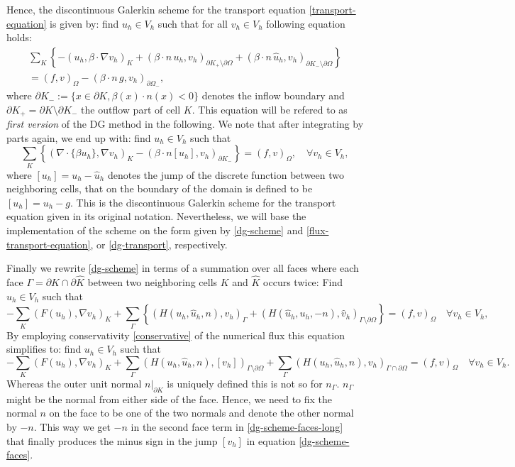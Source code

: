 \documentclass[11pt]{article}
\begin{document}
Hence, the discontinuous Galerkin scheme for the transport equation
\eqref{transport-equation} is given by: find $u_h\in V_h$ such that for all $v_h\in V_h$ following equation holds:
\begin{multline}\label{dg-transport}
  \sum_K\left\{-(u_h,\beta\cdot\nabla v_h)_K+(\beta\cdot n\, u_h, v_h)_{\partial K_+\setminus\partial\Omega}+(\beta\cdot n\, \hat u_h, v_h)_{\partial K_-\setminus\partial\Omega}\right\}\\
=(f,v)_\Omega-(\beta\cdot n\, g, v_h)_{\partial\Omega_-},
\end{multline}
where $\partial K_-:=\{x\in\partial K, \beta(x)\cdot n(x)<0\}$ denotes
the inflow boundary and $\partial K_+=\partial K\setminus \partial
K_-$ the outflow part of cell $K$. This equation will be
refered to as \emph{first version} of the DG method in the following. We
note that after integrating by parts again, we end up with: find
$u_h\in V_h$ such that
\[
  \sum_K\left\{(\nabla\cdot\{\beta u_h\},\nabla v_h)_K-(\beta\cdot n [u_h], v_h)_{\partial K_-}\right\}=(f,v)_\Omega, \quad\forall v_h\in V_h,
\]
where $[u_h]=u_h-\hat u_h$ denotes the jump of the discrete function
between two neighboring cells, that on the boundary of the domain is defined to be $[u_h]=u_h-g$. This is the discontinuous Galerkin
scheme for the transport equation given in its original notation.
Nevertheless, we will base the implementation of the scheme on the form
given by \eqref{dg-scheme} and \eqref{flux-transport-equation}, or
\eqref{dg-transport}, respectively.

Finally we rewrite \eqref{dg-scheme} in terms of a summation over all faces 
where each face $\Gamma=\partial
K\cap\partial \hat K$ between two neighboring cells $K$ and $\hat K$
occurs twice: Find $u_h\in V_h$ such that
\begin{equation}\label{dg-scheme-faces-long}
  -\sum_K(F(u_h),\nabla v_h)_K+\sum_\Gamma\left\{(H(u_h,\hat u_h,n), v_h)_\Gamma+(H(\hat u_h, u_h,-n), \hat v_h)_{\Gamma\setminus\partial\Omega}\right\}=(f,v)_\Omega \quad\forall v_h\in V_h,
\end{equation}
By employing conservativity \eqref{conservative} of the numerical flux
this equation simplifies to: find $u_h\in V_h$ such that
\begin{equation}\label{dg-scheme-faces}
  -\sum_K(F(u_h),\nabla v_h)_K+\sum_\Gamma(H(u_h,\hat u_h,n), [v_h])_{\Gamma\setminus\partial\Omega}+\sum_\Gamma(H(u_h,\hat u_h,n), v_h)_{\Gamma\cap\partial\Omega}=(f,v)_\Omega \quad\forall v_h\in V_h.
\end{equation}
Whereas the outer unit normal
$n|_{\partial K}$ is uniquely defined this is not so for $n_\Gamma$. $n_\Gamma$ might be the normal from
either side of the face. Hence, we need to fix the normal $n$ on the face to
be one of the two normals and denote the other normal by
$-n$. This way we get $-n$ in the second face term in
\eqref{dg-scheme-faces-long} that finally produces the minus sign in
the jump $[v_h]$ in equation \eqref{dg-scheme-faces}.
\end{document}
